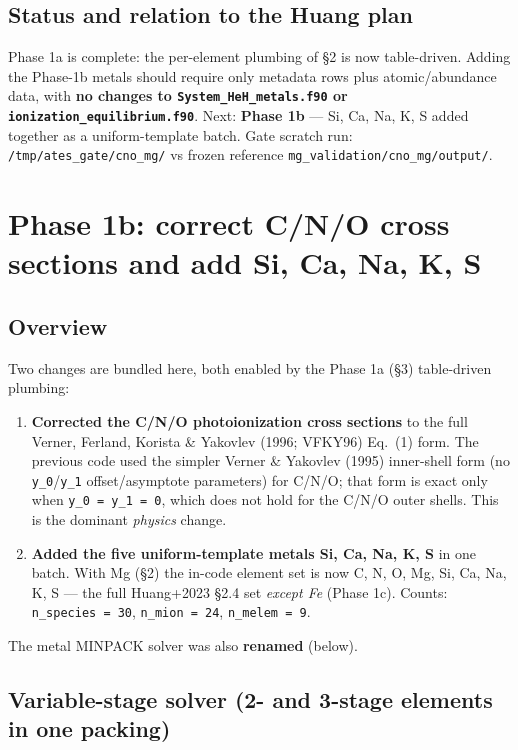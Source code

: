 \documentclass[english,a4paper]{kiseon_memo}
\begin{document}
\subsection{Status and relation to the Huang plan}

Phase 1a is complete: the per-element plumbing of \S2 is now table-driven. Adding
the Phase-1b metals should require only metadata rows plus atomic/abundance data,
with \textbf{no changes to \texttt{System\_HeH\_metals.f90} or
\texttt{ionization\_equilibrium.f90}}. Next: \textbf{Phase 1b} --- Si, Ca, Na, K,
S added together as a uniform-template batch. Gate scratch run:
\texttt{/tmp/ates\_gate/cno\_mg/} vs frozen reference
\texttt{mg\_validation/cno\_mg/output/}.

\section{Phase 1b: correct C/N/O cross sections and add Si, Ca, Na, K, S}

\subsection{Overview}

Two changes are bundled here, both enabled by the Phase 1a (\S3) table-driven
plumbing:
\begin{enumerate}
\item \textbf{Corrected the C/N/O photoionization cross sections} to the full
  Verner, Ferland, Korista \& Yakovlev (1996; VFKY96) Eq.~(1) form. The previous
  code used the simpler Verner \& Yakovlev (1995) inner-shell form (no
  \verb|y_0|/\verb|y_1| offset/asymptote parameters) for C/N/O; that form is
  exact only when \verb|y_0 = y_1 = 0|, which does not hold for the C/N/O outer
  shells. This is the dominant \emph{physics} change.
\item \textbf{Added the five uniform-template metals Si, Ca, Na, K, S} in one
  batch. With Mg (\S2) the in-code element set is now C, N, O, Mg, Si, Ca, Na,
  K, S --- the full Huang+2023 \S2.4 set \emph{except Fe} (Phase 1c). Counts:
  \verb|n_species = 30|, \verb|n_mion = 24|, \verb|n_melem = 9|.
\end{enumerate}
The metal MINPACK solver was also \textbf{renamed} (below).

\subsection{Variable-stage solver (2- and 3-stage elements in one packing)}
\end{document}
